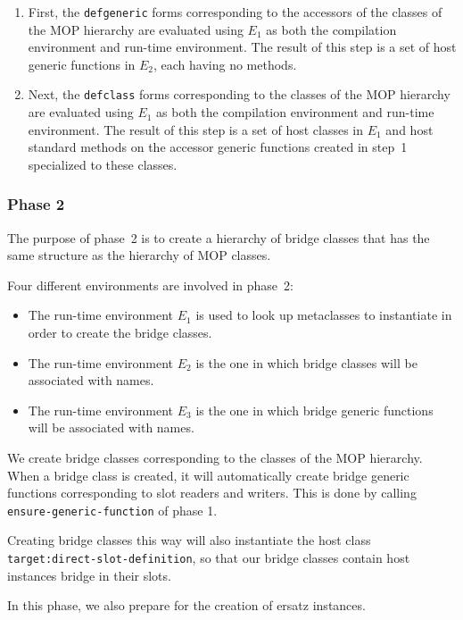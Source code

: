 \begin{enumerate}
\item First, the \texttt{defgeneric} forms corresponding to the
  accessors of the classes of the MOP hierarchy are evaluated using
  $E_1$ as both the compilation environment and run-time environment.
  The result of this step is a set of host generic functions in $E_2$,
  each having no methods.
\item Next, the \texttt{defclass} forms corresponding to the classes
  of the MOP hierarchy are evaluated using $E_1$ as both the
  compilation environment and run-time environment.  The result of
  this step is a set of host classes in $E_1$ and host standard
  methods on the accessor generic functions created in step~1
  specialized to these classes.
\end{enumerate}

\subsubsection{Phase 2}

The purpose of phase~2 is to create a hierarchy of bridge classes that
has the same structure as the hierarchy of MOP classes.

Four different environments are involved in phase~2:

\begin{itemize}
\item The run-time environment $E_1$ is used to look up metaclasses to
  instantiate in order to create the bridge classes.
\item The run-time environment $E_2$ is the one in which bridge
  classes will be associated with names.
\item The run-time environment $E_3$ is the one in which bridge
  generic functions will be associated with names.
\end{itemize}

We create bridge classes corresponding to the classes of the MOP
hierarchy.  When a bridge class is created, it will automatically
create bridge generic functions corresponding to slot readers and
writers.  This is done by calling \texttt{ensure-generic-function} of
phase 1.

Creating bridge classes this way will also instantiate the host class
\texttt{target:direct-slot-definition}, so that our bridge classes
contain host instances bridge in their slots. 

In this phase, we also prepare for the creation of ersatz instances.


